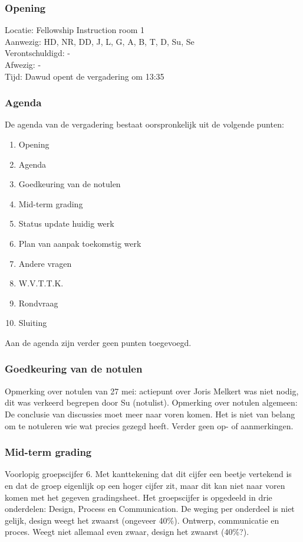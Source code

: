 \subsubsection{Opening}
Locatie: Fellowship Instruction room 1\\
Aanwezig: HD, NR, DD, J, L, G, A, B, T, D, Su, Se\\
Verontschuldigd: - \\
Afwezig: - \\
Tijd: Dawud opent de vergadering om 13:35\\

\subsubsection{Agenda}
De agenda van de vergadering bestaat oorspronkelijk uit de volgende punten:
\begin{enumerate}
\item Opening
\item Agenda
\item Goedkeuring van de notulen
\item Mid-term grading
\item Status update huidig werk
\item Plan van aanpak toekomstig werk
\item Andere vragen
\item W.V.T.T.K.
\item Rondvraag
\item Sluiting
\end{enumerate}

Aan de agenda zijn verder geen punten toegevoegd.

\subsubsection{Goedkeuring van de notulen}
Opmerking over notulen van 27 mei: actiepunt over Joris Melkert was niet nodig, dit was verkeerd begrepen door Su (notulist).
Opmerking over notulen algemeen: De conclusie van discussies moet meer naar voren komen. Het is niet van belang om te notuleren wie wat precies gezegd heeft.
Verder geen op- of aanmerkingen.

\subsubsection{Mid-term grading}
Voorlopig groepscijfer 6. Met kanttekening dat dit cijfer een beetje vertekend is en dat de groep eigenlijk op een hoger cijfer zit, maar dit kan niet naar voren komen met het gegeven gradingsheet. Het groepscijfer is opgedeeld in drie onderdelen: Design, Process en Communication. De weging per onderdeel is niet gelijk, design weegt het zwaarst (ongeveer 40\%).
\newline\newline
Ontwerp, communicatie en proces. Weegt niet allemaal even zwaar, design het zwaarst (40\%?).

